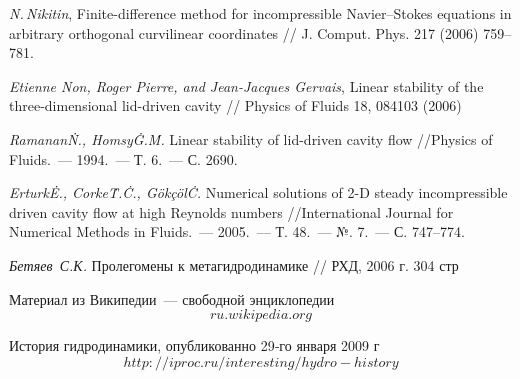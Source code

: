 \begin{thebibliography}{99}

  \textit{N.\,Nikitin}, Finite-difference method for incompressible Navier–Stokes equations in 
  arbitrary orthogonal curvilinear coordinates // J. Comput. Phys. 217 (2006) 759–781.

  \textit{Etienne Non, Roger Pierre, and Jean-Jacques Gervais}, Linear stability of the 
  three-dimensional lid-driven cavity // Physics of Fluids 18, 084103 (2006)
  
   \textit{Ramanan\.N., Homsy\.G.\.M.} Linear stability of lid-driven cavity flow 
  //Physics of Fluids.~--- 1994.~--- Т. 6.~--- С. 2690.
  
   \textit{Erturk\.E., Corke\.T.\.C., Gökçöl\.C.} Numerical solutions of 2-D steady incompressible
  driven cavity flow at high Reynolds numbers //International Journal for Numerical Methods in 
  Fluids.~--- 2005.~--- Т. 48.~--- №. 7.~--- С. 747--774.

	\textit{Бе­тя­ев~С.К.} Про­ле­го­ме­ны к метагидродинамике // РХД, 2006 г. 304 стр
  
		Материал из Википедии~--- свободной энциклопедии \[ru.wikipedia.org\]

		Ис­то­рия гид­ро­ди­на­ми­ки, опубликованно 29‑го января 2009 г \[http://iproc.ru/interesting/hydro-history\]

\end{thebibliography}
